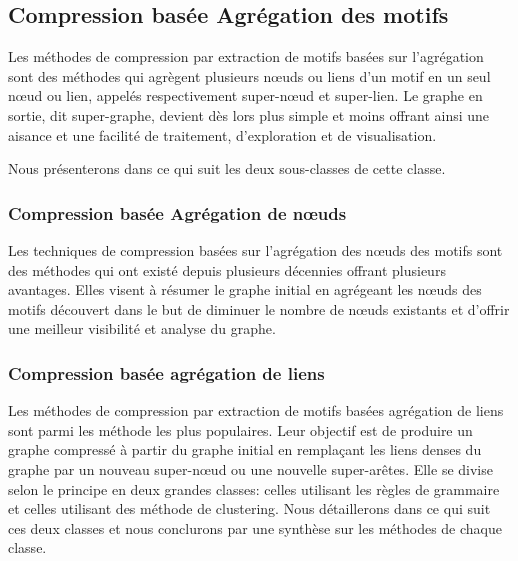 \documentclass[a4paper,oneside,12pt]{report}
\theoremstyle{definition}
\begin{document}
				
				\subsection{Compression basée Agrégation des motifs}
				
					Les méthodes de compression par extraction de motifs basées sur l'agrégation sont des méthodes   qui agrègent plusieurs nœuds ou liens d'un motif en un seul nœud ou lien, appelés respectivement super-nœud et super-lien. Le graphe en sortie, dit super-graphe, devient dès lors plus simple et moins offrant ainsi une aisance et une facilité de traitement, d'exploration et de visualisation. 
					
					Nous présenterons dans ce qui suit les deux sous-classes de cette classe. 
					
					 
					\subsubsection{Compression basée Agrégation de nœuds}
					
					Les techniques de compression basées sur l'agrégation des nœuds des motifs sont des méthodes qui ont existé depuis plusieurs décennies offrant plusieurs avantages. 
					Elles visent à résumer le graphe initial en agrégeant les nœuds des motifs découvert dans le but de diminuer le nombre de nœuds existants  et d'offrir une meilleur visibilité et analyse du graphe. 
						
						
						
						
					\subsubsection{Compression basée agrégation de liens}
						Les méthodes de compression par extraction de motifs basées agrégation de liens sont parmi les méthode les plus populaires. Leur objectif est de produire un graphe compressé à partir du graphe initial en remplaçant les liens denses du graphe par un nouveau super-nœud ou une nouvelle super-arêtes. Elle se divise selon le principe en deux grandes classes: celles utilisant les règles de grammaire et celles utilisant des méthode de clustering. Nous détaillerons dans ce qui suit ces deux classes et nous conclurons par une synthèse sur les méthodes de chaque classe.
						
\end{document}
